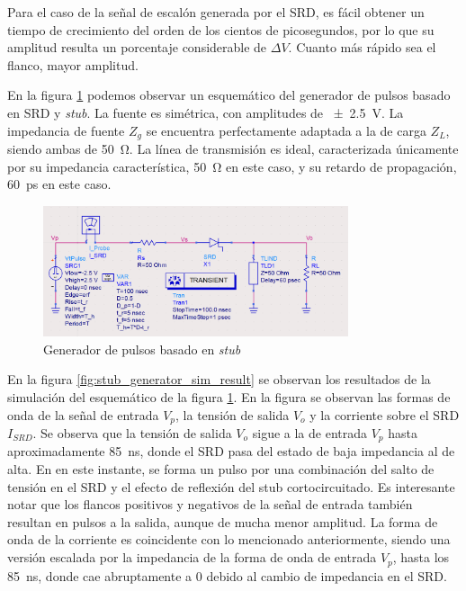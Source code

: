 Para el caso de la señal de escalón generada por el SRD, es fácil obtener un
tiempo de crecimiento del orden de los cientos de picosegundos, por lo que su
amplitud resulta un porcentaje considerable de $\Delta V$. Cuanto más rápido sea
el flanco, mayor amplitud.

En la figura \ref{fig:stub_generator_circuit} podemos observar un esquemático
del generador de pulsos basado en SRD y \textit{stub}. La fuente es simétrica,
con amplitudes de \qty{\pm 2.5}{\volt}. La impedancia de fuente $Z_g$ se
encuentra perfectamente adaptada a la de carga $Z_L$, siendo ambas de
\qty{50}{\ohm}. La línea de transmisión es ideal, caracterizada únicamente por
su impedancia característica, \qty{50}{\ohm} en este caso, y su retardo de
propagación, \qty{60}{\pico\second} en este caso.

\begin{figure}[tbp]
    \centering
    \includegraphics[width=0.8\textwidth]{images/stub_generator_circuit.png}
    \caption{Generador de pulsos basado en \textit{stub}}
    \label{fig:stub_generator_circuit}
\end{figure}

En la figura \ref{fig:stub_generator_sim_result} se observan los resultados de
la simulación del esquemático de la figura \ref{fig:stub_generator_circuit}. En
la figura  se observan las formas de onda de la señal de entrada $V_p$, la
tensión de salida $V_o$ y la corriente sobre el SRD $I_{SRD}$. Se observa que la
tensión de salida $V_o$ sigue a la de entrada $V_p$ hasta aproximadamente
\qty{85}{\nano\second}, donde el SRD pasa del estado de baja impedancia al de
alta. En en este instante, se forma un pulso por una combinación del salto de
tensión en el SRD y el efecto de reflexión del stub cortocircuitado. Es
interesante notar que los flancos positivos y negativos de la señal de entrada
también resultan en pulsos a la salida, aunque de mucha menor amplitud. La forma
de onda de la corriente es coincidente con lo mencionado anteriormente, siendo
una versión escalada por la impedancia de la forma de onda de entrada $V_p$,
hasta los \qty{85}{\nano\second}, donde cae abruptamente a $0$ debido al cambio
de impedancia en el SRD.

